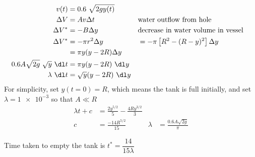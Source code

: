 \begin{enumerate}
          \begin{align}
              v(t)            & = 0.6\ \sqrt{2gy(t)}                               \\
              \Delta V        & = Av \Delta t                                    &
                              & \text{water outflow from hole}                     \\
              \Delta V^{*}    & = -B \Delta y                                    &
                              & \text{decrease in water volume in vessel}          \\
              \Delta V^{*}    & = -\pi r^{2} \Delta y                            &
                              & = -\pi \left[R^{2} - (R - y)^{2}\right] \Delta y   \\
                              & = \pi y (y - 2R) \Delta y                          \\
              0.6 A \sqrt{2g}\ \sqrt{y}\ \dl t
                              & = \pi y (y - 2R) \ \dl y                           \\
              \lambda \ \dl t & = \sqrt{y} (y - 2R)\ \dl y
          \end{align}
          For simplicity, set $ y(t = 0) = R $, which means the tank is full initially,
          and set $ \lambda = \num{1e-3} $ so that $ A \ll R $
          \begin{align}
              \lambda t + c & = \frac{2y^{5/2}}{5} - \frac{4Ry^{3/2}}{3}   \\
              c             & = \frac{-14R^{5/2}}{15}                    &
              \lambda       & = \frac{0.6 A \sqrt{2g}}{\pi}
          \end{align}

          \begin{figure}[H]
              \centering
          \end{figure}
          Time taken to empty the tank is $ t^{*} = \dfrac{14}{15 \lambda} $
\end{enumerate}